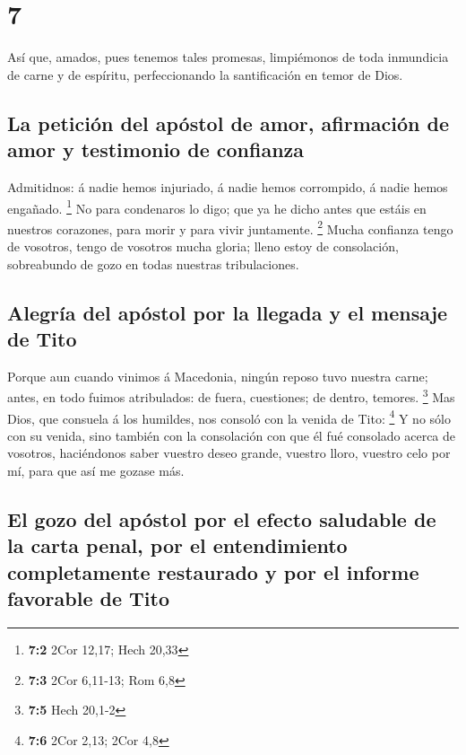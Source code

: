 \hypertarget{section-6}{%
\section{7}\label{section-6}}

 Así que, amados, pues tenemos tales promesas, limpiémonos
de toda inmundicia de carne y de espíritu, perfeccionando la
santificación en temor de Dios.

\hypertarget{la-peticiuxf3n-del-apuxf3stol-de-amor-afirmaciuxf3n-de-amor-y-testimonio-de-confianza}{%
\subsection{La petición del apóstol de amor, afirmación de amor y
testimonio de
confianza}\label{la-peticiuxf3n-del-apuxf3stol-de-amor-afirmaciuxf3n-de-amor-y-testimonio-de-confianza}}

 Admitidnos: á nadie hemos injuriado, á nadie hemos
corrompido, á nadie hemos engañado. \footnote{\textbf{7:2} 2Cor 12,17;
  Hech 20,33}  No para condenaros lo digo; que ya he dicho
antes que estáis en nuestros corazones, para morir y para vivir
juntamente. \footnote{\textbf{7:3} 2Cor 6,11-13; Rom 6,8} 
Mucha confianza tengo de vosotros, tengo de vosotros mucha gloria; lleno
estoy de consolación, sobreabundo de gozo en todas nuestras
tribulaciones.

\hypertarget{alegruxeda-del-apuxf3stol-por-la-llegada-y-el-mensaje-de-tito}{%
\subsection{Alegría del apóstol por la llegada y el mensaje de
Tito}\label{alegruxeda-del-apuxf3stol-por-la-llegada-y-el-mensaje-de-tito}}

 Porque aun cuando vinimos á Macedonia, ningún reposo tuvo
nuestra carne; antes, en todo fuimos atribulados: de fuera, cuestiones;
de dentro, temores. \footnote{\textbf{7:5} Hech 20,1-2} 
Mas Dios, que consuela á los humildes, nos consoló con la venida de
Tito: \footnote{\textbf{7:6} 2Cor 2,13; 2Cor 4,8}  Y no
sólo con su venida, sino también con la consolación con que él fué
consolado acerca de vosotros, haciéndonos saber vuestro deseo grande,
vuestro lloro, vuestro celo por mí, para que así me gozase más.

\hypertarget{el-gozo-del-apuxf3stol-por-el-efecto-saludable-de-la-carta-penal-por-el-entendimiento-completamente-restaurado-y-por-el-informe-favorable-de-tito}{%
\subsection{El gozo del apóstol por el efecto saludable de la carta
penal, por el entendimiento completamente restaurado y por el informe
favorable de
Tito}\label{el-gozo-del-apuxf3stol-por-el-efecto-saludable-de-la-carta-penal-por-el-entendimiento-completamente-restaurado-y-por-el-informe-favorable-de-tito}}

